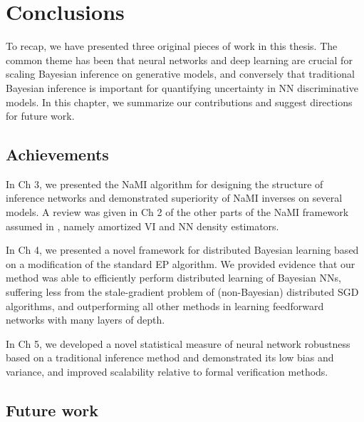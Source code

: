 \chapter{Conclusions}
\label{chp:conclusions}
To recap, we have presented three original pieces of work in this thesis. The common theme has been that neural networks and deep learning are crucial for scaling Bayesian inference on generative models, and conversely that traditional Bayesian inference is important for quantifying uncertainty in NN discriminative models. In this chapter, we summarize our contributions and suggest directions for future work.

\section{Achievements}
In Ch 3, we presented the NaMI algorithm for designing the structure of inference networks and demonstrated superiority of NaMI inverses on several models. A review was given in Ch 2 of the other parts of the NaMI framework assumed in \citet{WebbEtAl2018}, namely amortized VI and NN density estimators.

In Ch 4, we presented a novel framework for distributed Bayesian learning based on a modification of the standard EP algorithm. We provided evidence that our method was able to efficiently perform distributed learning of Bayesian NNs, suffering less from the stale-gradient problem of (non-Bayesian) distributed SGD algorithms, and outperforming all other methods in learning feedforward networks with many layers of depth.

In Ch 5, we developed a novel statistical measure of neural network robustness based on a traditional inference method and demonstrated its low bias and variance, and improved scalability relative to formal verification methods.


\section{Future work}
